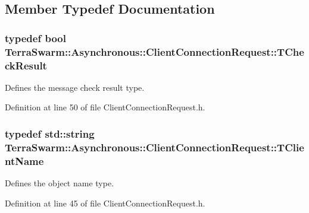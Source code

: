 \subsection{Member Typedef Documentation}
\hypertarget{class_terra_swarm_1_1_asynchronous_1_1_client_connection_request_a5c46a6a486f1f74b413e11b919b44d4f}{
\subsubsection[{T\-Check\-Result}]{\setlength{\rightskip}{0pt plus 5cm}typedef bool {\bf Terra\-Swarm\-::\-Asynchronous\-::\-Client\-Connection\-Request\-::\-T\-Check\-Result}}}\label{class_terra_swarm_1_1_asynchronous_1_1_client_connection_request_a5c46a6a486f1f74b413e11b919b44d4f}


Defines the message check result type. 



Definition at line 50 of file Client\-Connection\-Request.\-h.

\hypertarget{class_terra_swarm_1_1_asynchronous_1_1_client_connection_request_a50a16fcfef8eb10d5191b6eaf0723a92}{
\subsubsection[{T\-Client\-Name}]{\setlength{\rightskip}{0pt plus 5cm}typedef std\-::string {\bf Terra\-Swarm\-::\-Asynchronous\-::\-Client\-Connection\-Request\-::\-T\-Client\-Name}}}\label{class_terra_swarm_1_1_asynchronous_1_1_client_connection_request_a50a16fcfef8eb10d5191b6eaf0723a92}


Defines the object name type. 



Definition at line 45 of file Client\-Connection\-Request.\-h.



